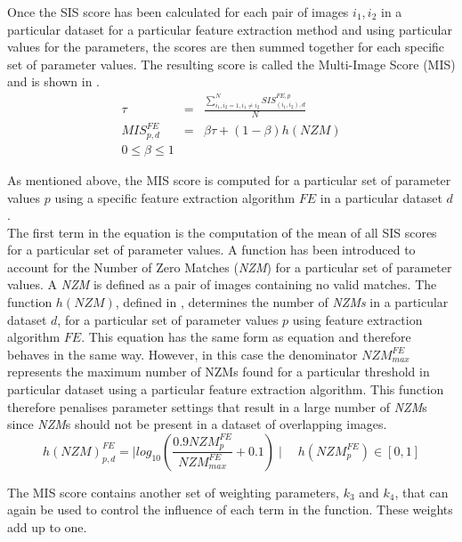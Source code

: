 \documentclass{report}
\begin{document}
Once the SIS score has been calculated for each pair of images $i_1, i_2$ in a particular dataset for a particular feature extraction method and using particular values for the parameters, the scores are then summed together for each specific set of parameter values. The resulting score is called the Multi-Image Score (MIS) and is shown in .\\

\begin{eqnarray}
\tau &=& \frac{\sum_{i_1, i_2=1 , i_1 \neq i_2}^{N} \textit{SIS}_{(i_1, i_2),d}^{FE,p}}{N}\\
MIS_{p, d}^{FE} &=& \beta \tau + (1-\beta) h(\textit{NZM}) \\
0 \leq \beta \leq 1
\label{eqn:mims}
\end{eqnarray}

As mentioned above, the MIS score is computed for a particular set of parameter values $p$ using a specific feature extraction algorithm $FE$ in  a particular dataset $d$. \\

The first term in the equation is the computation of the mean of all SIS scores for a particular set of parameter values. A function has been introduced to account for the Number of Zero Matches (\textit{NZM}) for a particular set of parameter values. A \textit{NZM} is defined as a pair of images containing no valid matches. The function $h(NZM)$, defined in , determines the number of \textit{NZMs} in a particular dataset $d$, for a particular set of parameter values $p$ using feature extraction algorithm $FE$. This equation has the same form as equation  and therefore behaves in the same way. However, in this case the denominator $\textit{NZM}_{max}^{FE}$ represents the maximum number of NZMs found for a particular threshold in particular dataset using a particular feature extraction algorithm. This function therefore penalises parameter settings that result in a large number of \textit{NZM}s since \textit{NZM}s should not be present in a dataset of overlapping images. \\

\begin{equation}
h(\textit{NZM})_{p, d}^{FE} = \mid log_{10}(\frac{0.9\textit{NZM}_{p}^{FE}}{\textit{NZM}_{max}^{FE}} + 0.1) \mid \quad h(\textit{NZM}_{p}^{FE})\in [0, 1]
\label{eqn:nzm}
\end{equation}

The MIS score contains another set of weighting parameters, $k_3$ and $k_4$, that can again be used to control the influence of each term in the function. These weights add up to one.\\
\end{document}
